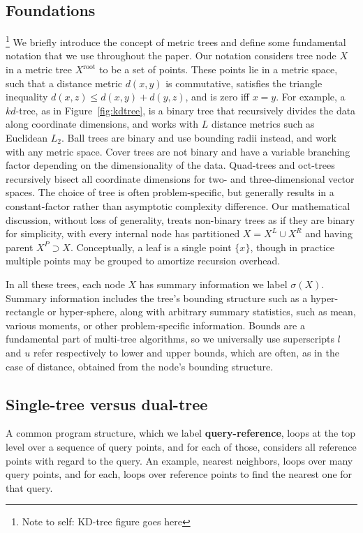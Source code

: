 \documentclass[twoside,leqno,twocolumn]{article}
\newcommand{\authornote}[1]{\footnote{Note to self: #1}}
\newcommand{\union}{\cup}
\newcommand{\fig}[1]{Figure~\ref{fig:#1}}
\newcommand{\mysub}[1]{\subsection{#1} }
\newcommand{\defterm}[1]{{\bf #1}}
\newcommand{\kdroot}[1]{#1^{\text{root}}}
\newcommand{\kdleft}[1]{#1^{\!L}}
\newcommand{\kdright}[1]{#1^{\!R}}
\newcommand{\kdparent}[1]{#1^{\!P}}
\newcommand{\dist}[2]{d(#1,#2)}
\newcommand{\outstat}{\sigma}
\begin{document}
\mysub{Foundations}
\authornote{KD-tree figure goes here}
We briefly introduce the concept of metric trees and define some fundamental notation that we use throughout the paper.
Our notation considers tree node $X$ in a metric tree $\kdroot{X}$ to be a set of points.
These points lie in a metric space, such that a distance metric $\dist{x}{y}$ is commutative, satisfies the triangle inequality $\dist{x}{z} \leq \dist{x}{y} + \dist{y}{z}$, and is zero iff $x = y$.
For example, a $kd$-tree\cite{preparata_kdtrees}, as in \fig{kdtree}, is a binary tree that recursively divides the data along coordinate dimensions, and works with $L$ distance metrics such as Euclidean $L_2$.
Ball trees are binary and use bounding radii instead, and work with any metric space.
Cover trees are not binary and have a variable branching factor depending on the dimensionality of the data.
Quad-trees and oct-trees recursively bisect all coordinate dimensions for two- and three-dimensional vector spaces.
The choice of tree is often problem-specific, but generally results in a constant-factor rather than asymptotic complexity difference.
Our mathematical discussion, without loss of generality, treats non-binary trees as if they are binary for simplicity, with every internal node has partitioned $X = \kdleft{X} \union \kdright{X}$ and having parent $\kdparent{X} \supset X$.
Conceptually, a leaf is a single point $\{x\}$, though in practice multiple points may be grouped to amortize recursion overhead.

In all these trees, each node $X$ has summary information we label $\outstat(X)$.
Summary information includes the tree's bounding structure such as a hyper-rectangle or hyper-sphere, along with arbitrary summary statistics, such as mean, various moments, or other problem-specific information.
Bounds are a fundamental part of multi-tree algorithms, so we universally use superscripts $l$ and $u$ refer respectively to lower and upper bounds, which are often, as in the case of distance, obtained from the node's bounding structure.

\mysub{Single-tree versus dual-tree}
A common program structure, which we label \defterm{query-reference}, loops at the top level over a sequence of query points, and for each of those, considers all reference points with regard to the query.
An example, nearest neighbors, loops over many query points, and for each, loops over reference points to find the nearest one for that query.
\end{document}
